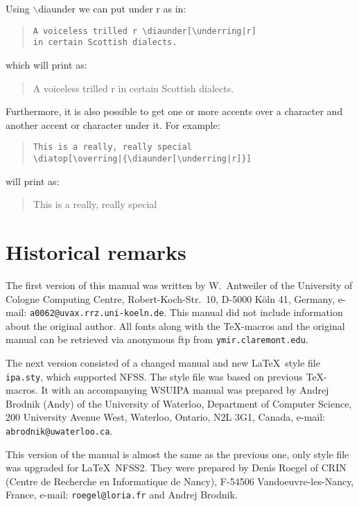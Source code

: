 \documentclass[12pt]{article}
\newcommand{\B}[1]{$\backslash$#1}
\begin{document}
Using \B{diaunder} we can put \underring under r as in:
%
\begin{quote}\begin{verbatim}
A voiceless trilled r \diaunder[\underring|r]
in certain Scottish dialects.
\end{verbatim}\end{quote}
%
which will print as:
%
\begin{quote}
A voiceless trilled r \diaunder[\underring|r]
in certain Scottish dialects.
\end{quote}
%

Furthermore, it is also possible to get one or more accents over a
character and another accent or character under it. For example:
%
\begin{quote}\begin{verbatim}
This is a really, really special
\diatop[\overring|{\diaunder[\underring|r]}]
\end{verbatim}\end{quote}
%
will print as:
%
\begin{quote}
This is a really, really special
\diatop[\overring|{\diaunder[\underring|r]}]
\end{quote}

\section{Historical remarks}

The first version of this manual was written by W.\ Antweiler of the
University of Cologne Computing Centre, Robert-Koch-Str.\ 10, D-5000
K\"{o}ln 41, Germany, e-mail: {\tt a0062@uvax.rrz.uni-koeln.de}. This
manual did not include information about the original author. All
fonts along with the \TeX-macros and the original manual can be
retrieved via anonymous ftp from {\tt ymir.claremont.edu}.

The next version consisted of a changed manual and new \LaTeX\ style
file {\tt ipa.sty}, which supported NFSS. The style file was based on
previous \TeX-macros. It with an accompanying WSUIPA manual was
prepared by Andrej Brodnik (Andy) of the University of Waterloo,
Department of Computer Science, 200 University Avenue West, Waterloo,
Ontario, N2L 3G1, Canada, e-mail: {\tt abrodnik@uwaterloo.ca}.

This version of the manual is almost the same as the previous one,
only style file was upgraded for \LaTeX\ NFSS2. They were prepared by
Denis Roegel of CRIN (Centre de Recherche en Informatique de Nancy),
F-54506 Vandoeuvre-les-Nancy, France, e-mail: {\tt roegel@loria.fr}
and Andrej Brodnik.
\end{document}
